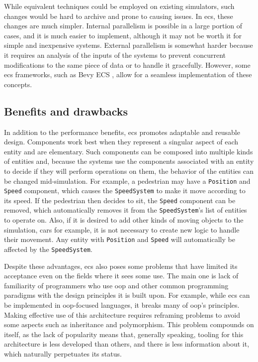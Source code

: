 \documentclass[twoside, 11pt]{article}
\begin{document}
While equivalent techniques could be employed on existing simulators, such changes would be hard to archive and prone to causing issues. In \gls{ecs}, these changes are much simpler. Internal parallelism is possible in a large portion of cases, and it is much easier to implement, although it may not be worth it for simple and inexpensive systems. External parallelism is somewhat harder because it requires an analysis of the inputs of the systems to prevent concurrent modifications to the same piece of data or to handle it gracefully. However, some \gls{ecs} frameworks, such as Bevy ECS \cite{bevy}, allow for a seamless implementation of these concepts.

\subsection{Benefits and drawbacks}

In addition to the performance benefits, \gls{ecs} promotes adaptable and reusable design. Components work best when they represent a singular aspect of each entity and are elementary. Such components can be composed into multiple kinds of entities and, because the systems use the components associated with an entity to decide if they will perform operations on them, the behavior of the entities can be changed mid-simulation. For example, a pedestrian may have a \verb|Position| and \verb|Speed| component, which causes the \verb|SpeedSystem| to make it move according to its speed. If the pedestrian then decides to sit, the \verb|Speed| component can be removed, which automatically removes it from the \verb|SpeedSystem|'s list of entities to operate on. Also, if it is desired to add other kinds of moving objects to the simulation, cars for example, it is not necessary to create new logic to handle their movement. Any entity with \verb|Position| and \verb|Speed| will automatically be affected by the \verb|SpeedSystem|.

Despite these advantages, \gls{ecs} also poses some problems that have limited its acceptance even on the fields where it sees some use. The main one is lack of familiarity of programmers who use \gls{oop} and other common programming paradigms with the design principles it is built upon. For example, while \gls{ecs} can be implemented in \gls{oop}-focused languages, it breaks many of \gls{oop}'s principles. Making effective use of this architecture requires reframing problems to avoid some aspects such as inheritance and polymorphism. This problem compounds on itself, as the lack of popularity means that, generally speaking, tooling for this architecture is less developed than others, and there is less information about it, which naturally perpetuates its status.
\end{document}
